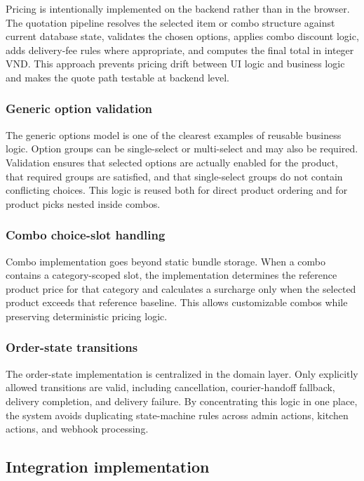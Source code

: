Pricing is intentionally implemented on the backend rather than in the browser. The quotation pipeline resolves the selected item or combo structure against current database state, validates the chosen options, applies combo discount logic, adds delivery-fee rules where appropriate, and computes the final total in integer VND. This approach prevents pricing drift between UI logic and business logic and makes the quote path testable at backend level.

\subsubsection{Generic option validation}

The generic options model is one of the clearest examples of reusable business logic. Option groups can be single-select or multi-select and may also be required. Validation ensures that selected options are actually enabled for the product, that required groups are satisfied, and that single-select groups do not contain conflicting choices. This logic is reused both for direct product ordering and for product picks nested inside combos.

\subsubsection{Combo choice-slot handling}

Combo implementation goes beyond static bundle storage. When a combo contains a category-scoped slot, the implementation determines the reference product price for that category and calculates a surcharge only when the selected product exceeds that reference baseline. This allows customizable combos while preserving deterministic pricing logic.

\subsubsection{Order-state transitions}

The order-state implementation is centralized in the domain layer. Only explicitly allowed transitions are valid, including cancellation, courier-handoff fallback, delivery completion, and delivery failure. By concentrating this logic in one place, the system avoids duplicating state-machine rules across admin actions, kitchen actions, and webhook processing.

\subsection{Integration implementation}

